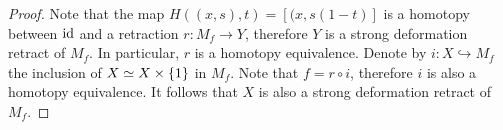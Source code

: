 \begin{proof}
Note that the map $H((x,s),t) = [(x, s(1-t)]$ is a homotopy between
$\operatorname{id}$ and a retraction $r \colon M_f \to Y$, therefore $Y$ is a
strong deformation retract of $M_f$. In particular, $r$ is a
homotopy equivalence. Denote by $i \colon X \hookrightarrow M_f$
the inclusion of $X \simeq X \times \left\{1\right\}$ in $M_f$. Note that
$f = r \circ i$, therefore $i$ is also a homotopy equivalence. It
follows that $X$ is also a strong deformation retract of $M_f$.
\end{proof}
